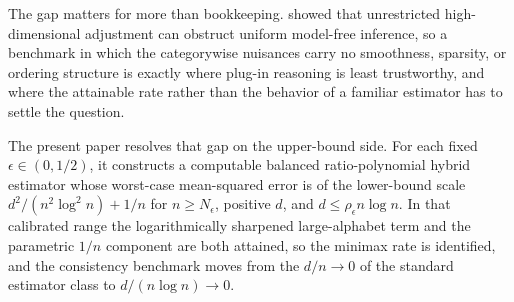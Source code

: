 The gap matters for more than bookkeeping. \citet{RobinsRitov1997} showed that unrestricted high-dimensional adjustment can obstruct uniform model-free inference, so a benchmark in which the categorywise nuisances carry no smoothness, sparsity, or ordering structure is exactly where plug-in reasoning is least trustworthy, and where the attainable rate rather than the behavior of a familiar estimator has to settle the question.

The present paper resolves that gap on the upper-bound side. For each fixed \(\epsilon\in(0,1/2)\), it constructs a computable balanced ratio-polynomial hybrid estimator whose worst-case mean-squared error is of the lower-bound scale \(d^2/(n^2\log^2 n)+1/n\) for \(n\ge N_\epsilon\), positive \(d\), and \(d\le\rho_\epsilon n\log n\). In that calibrated range the logarithmically sharpened large-alphabet term and the parametric \(1/n\) component are both attained, so the minimax rate is identified, and the consistency benchmark moves from the \(d/n\to0\) of the standard estimator class to \(d/(n\log n)\to0\).
